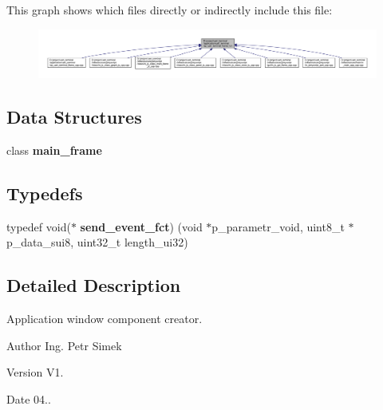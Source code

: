This graph shows which files directly or indirectly include this file\+:\nopagebreak
\begin{figure}[H]
\begin{center}
\leavevmode
\includegraphics[width=350pt]{ap__uart__terminal__frame__h_8h__dep__incl}
\end{center}
\end{figure}
\subsection*{Data Structures}
\begin{DoxyCompactItemize}
\item 
class \textbf{ main\+\_\+frame}
\end{DoxyCompactItemize}
\subsection*{Typedefs}
\begin{DoxyCompactItemize}
\item 
typedef void($\ast$ \textbf{ send\+\_\+event\+\_\+fct}) (void $\ast$p\+\_\+parametr\+\_\+void, uint8\+\_\+t $\ast$p\+\_\+data\+\_\+sui8, uint32\+\_\+t length\+\_\+ui32)
\end{DoxyCompactItemize}


\subsection{Detailed Description}
Application window component creator. 

\begin{DoxyAuthor}{Author}
Ing. Petr Simek 
\end{DoxyAuthor}
\begin{DoxyVersion}{Version}
V1. 
\end{DoxyVersion}
\begin{DoxyDate}{Date}
04.. 
\end{DoxyDate}
